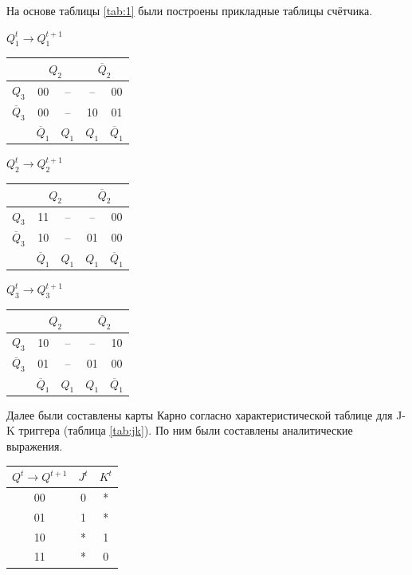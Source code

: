 \documentclass[14pt, a4paper]{extarticle}
\begin{document}
На основе таблицы \ref{tab:1} были построены прикладные таблицы счётчика.
\begin{center}
	\small
	\setlength{\tabcolsep}{4.5pt}
	\begin{minipage}{0.32\textwidth}
		\centering
		\textbf{$Q_1^t \to Q_1^{t+1}$}\\[4pt]
		\begin{tabular}{|c|c|c|c|c|}
			\hline
			& \multicolumn{2}{c|}{$Q_2$} & \multicolumn{2}{c|}{$\overline{Q}_2$} \\ \hline
			$Q_3$ & 00 & -- & -- & 00 \\ \hline
			$\overline{Q}_3$ & 00 & -- & 10 & 01 \\ \hline
			& $\overline{Q}_1$ & $Q_1$ & $Q_1$ & $\overline{Q}_1$ \\ \hline
		\end{tabular}
	\end{minipage}
	\hfill
	\begin{minipage}{0.32\textwidth}
		\centering
		\textbf{$Q_2^t \to Q_2^{t+1}$}\\[4pt]
		\begin{tabular}{|c|c|c|c|c|}
			\hline
			& \multicolumn{2}{c|}{$Q_2$} & \multicolumn{2}{c|}{$\overline{Q}_2$} \\ \hline
			$Q_3$ & 11 & -- & -- & 00 \\ \hline
			$\overline{Q}_3$ & 10 & -- & 01 & 00 \\ \hline
			& $\overline{Q}_1$ & $Q_1$ & $Q_1$ & $\overline{Q}_1$ \\ \hline
		\end{tabular}
	\end{minipage}
	\hfill
	\begin{minipage}{0.32\textwidth}
		\centering
		\textbf{$Q_3^t \to Q_3^{t+1}$}\\[4pt]
		\begin{tabular}{|c|c|c|c|c|}
			\hline
			& \multicolumn{2}{c|}{$Q_2$} & \multicolumn{2}{c|}{$\overline{Q}_2$} \\ \hline
			$Q_3$ & 10 & -- & -- & 10 \\ \hline
			$\overline{Q}_3$ & 01 & -- & 01 & 00 \\ \hline
			& $\overline{Q}_1$ & $Q_1$ & $Q_1$ & $\overline{Q}_1$ \\ \hline
		\end{tabular}
	\end{minipage}
\end{center}

Далее были составлены карты Карно согласно характеристической таблице для J-K триггера (таблица \ref{tab:jk}). По ним были составлены аналитические выражения.
\begin{center}
	\begin{tabular}{|c|c|c|}
		\hline
		$Q^t \rightarrow Q^{t+1}$ & $J^t$ & $K^t$ \\ \hline
		00 & 0 & * \\ \hline
		01 & 1 & * \\ \hline
		10 & * & 1 \\ \hline
		11 & * & 0 \\ \hline
	\end{tabular}
	\label{tab:jk}
\end{center}
\end{document}

